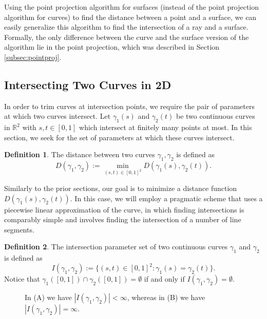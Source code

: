 \documentclass[a4paper, 11pt]{report}
\theoremstyle{definition}
\newtheorem{definition}{Definition}[section]
\begin{document}
	Using the point projection algorithm for surfaces (instead of the point projection algorithm for curves) to find the distance between a point and a surface, we can easily generalize this algorithm to find the intersection of a ray and a surface. Formally, the only difference between the curve and the surface version of the algorithm lie in the point projection, which was described in Section \ref{subsec:pointproj}.

\subsection{Intersecting Two Curves in 2D}
	In order to trim curves at intersection points, we require the pair of parameters at which two curves intersect. Let $\gamma_1(s)$ and $\gamma_2(t)$ be two continuous curves in $\mathbb{R}^2$ with $s,t \in [0,1]$ which intersect at finitely many points at most. In this section, we seek for the set of parameters at which these curves intersect.

	\begin{definition}
		The distance between two curves $\gamma_1, \gamma_2$ is defined as
			$$ D(\gamma_1, \gamma_2) := \min_{(s,t) \in [0,1]^2} D(\gamma_1(s), \gamma_2(t)).$$
	\end{definition}

	Similarly to the prior sections, our goal is to minimize a distance function $D(\gamma_1(s), \gamma_2(t))$. In this case, we will employ a pragmatic scheme that uses a piecewise linear approximation of the curve, in which finding intersections is comparably simple and involves finding the intersection of a number of line segments.

	\begin{definition}
		The intersection parameter set of two continuous curves $\gamma_1$ and $\gamma_2$ is defined as
				$$ I(\gamma_1, \gamma_2) := \{(s,t) \in [0,1]^2 : \gamma_1(s) = \gamma_2(t)\}.$$
		Notice that $\gamma_1([0,1]) \cap \gamma_2([0,1]) = \emptyset$ if and only if $I(\gamma_1, \gamma_2) = \emptyset$.
	\end{definition}

	\begin{figure}[H]
		\centering
		
		\caption{In (A) we have $|I(\gamma_1, \gamma_2)| < \infty$, whereas in (B) we have $|I(\gamma_1, \gamma_2)| = \infty$.}
		\label{fig:curveIntersectionConnectedness}
	\end{figure}
\end{document}

